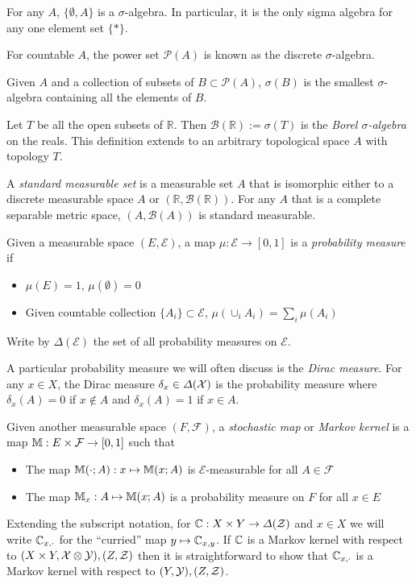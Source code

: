 For any $A$, $\{\emptyset,A\}$ is a $\sigma$-algebra. In particular, it is the only sigma algebra for any one element set $\{*\}$.

For countable $A$, the power set $\mathscr{P}(A)$ is known as the discrete $\sigma$-algebra.

Given $A$ and a collection of subsets of $B\subset\mathscr{P}(A)$, $\sigma(B)$ is the smallest $\sigma$-algebra containing all the elements of $B$. 

Let $T$ be all the open subsets of $\mathbb{R}$. Then $\mathcal{B}(\mathbb{R}):=\sigma(T)$ is the \emph{Borel $\sigma$-algebra} on the reals. This definition extends to an arbitrary topological space $A$ with topology $T$.

A \emph{standard measurable set} is a measurable set $A$ that is isomorphic either to a discrete measurable space $A$ or $(\mathbb{R}, \mathcal{B}(\mathbb{R}))$. For any $A$ that is a complete separable metric space, $(A,\mathcal{B}(A))$ is standard measurable. 

Given a measurable space $(E,\mathcal{E})$, a map $\mu:\mathcal{E}\to [0,1]$ is a \emph{probability measure} if
\begin{itemize}
	\item $\mu(E)=1$, $\mu(\emptyset)=0$
	\item Given countable collection $\{A_i\}\subset\mathscr{E}$, $\mu(\cup_{i} A_i) = \sum_i \mu(A_i)$
\end{itemize}

Write by $\Delta(\mathcal{E})$ the set of all probability measures on $\mathcal{E}$.

A particular probability measure we will often discuss is the \emph{Dirac measure}. For any $x\in X$, the Dirac measure $\delta_x\in \Delta(\mathcal{X})$ is the probability measure where $\delta_x(A)=0$ if $x\not\in A$ and $\delta_x(A)=1$ if $x\in A$.

Given another measurable space $(F,\mathcal{F})$, a \emph{stochastic map} or \emph{Markov kernel} is a map $\mathbb{M}:E\times\mathcal{F}\to [0,1]$ such that
\begin{itemize}
	\item The map $\mathbb{M}(\cdot;A):x\mapsto \mathbb{M}(x;A)$ is $\mathcal{E}$-measurable for all $A\in \mathcal{F}$
	\item The map $\mathbb{M}_x:A\mapsto \mathbb{M}(x;A)$ is a probability measure on $F$ for all $x\in E$
\end{itemize}

Extending the subscript notation, for $\mathbb{C}:X\times Y\to \Delta(\mathcal{Z})$  and $x\in X$ we will write $\mathbb{C}_{x,\cdot}$ for the ``curried'' map $y\mapsto \mathbb{C}_{x,y}$. If $\mathbb{C}$ is a Markov kernel with respect to $(X\times Y, \mathcal{X}\otimes\mathcal{Y}),(Z,\mathcal{Z})$ then it is straightforward to show that $\mathbb{C}_{x,\cdot}$ is a Markov kernel with respect to $(Y,\mathcal{Y}),(Z,\mathcal{Z})$.

